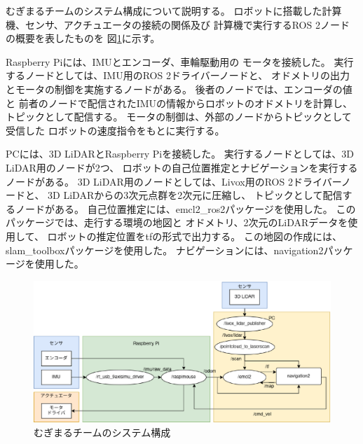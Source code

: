 むぎまるチームのシステム構成について説明する。
ロボットに搭載した計算機、センサ、アクチュエータの接続の関係及び
計算機で実行するROS 2ノードの概要を表したものを
図\ref{fig:mugimaru_system}に示す。

Raspberry Piには、IMUとエンコーダ、車輪駆動用の
モータを接続した。
実行するノードとしては、IMU用のROS 2ドライバーノードと、
オドメトリの出力とモータの制御を実施するノードがある。
後者のノードでは、エンコーダの値と
前者のノードで配信されたIMUの情報からロボットのオドメトリを計算し、
トピックとして配信する。
モータの制御は、外部のノードからトピックとして受信した
ロボットの速度指令をもとに実行する。

PCには、3D LiDARとRaspberry Piを接続した。
実行するノードとしては、3D LiDAR用のノードが2つ、
ロボットの自己位置推定とナビゲーションを実行するノードがある。
3D LiDAR用のノードとしては、Livox用のROS 2ドライバーノードと、
3D LiDARからの3次元点群を2次元に圧縮し、
トピックとして配信するノードがある。
自己位置推定には、emcl2\_ros2パッケージ\cite{emcl2_ros2}を使用した。
このパッケージでは、走行する環境の地図と
オドメトリ、2次元のLiDARデータを使用して、
ロボットの推定位置をtfの形式で出力する。
この地図の作成には、slam\_toolboxパッケージ\cite{slam_toolbox}を使用した。
ナビゲーションには、navigation2パッケージ\cite{nav2}を使用した。

\begin{figure}[h]
  \begin{center}
    \includegraphics[width=1.0\linewidth]{figs/mugimaru_system_2024.eps}
    \caption{むぎまるチームのシステム構成}
    \label{fig:mugimaru_system}
  \end{center}
\end{figure}

